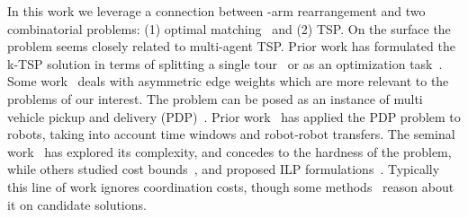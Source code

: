 
In this work we leverage a connection between \dual-arm rearrangement and two combinatorial problems: (1) optimal matching~\cite{edmonds1965maximum} and (2) TSP. On the surface the problem seems closely related to multi-agent TSP.
Prior work has formulated the k-TSP solution in terms of splitting a single tour~\cite{frederickson1976approximation} or as an optimization task~\cite{rathinam2006matroid}.
Some work~\cite{friggstad2013multiple} deals with asymmetric edge weights which are more relevant to the problems of our interest. 
The problem can be posed as an instance of multi vehicle pickup and delivery (PDP)~\cite{parragh2008survey}. 
Prior work~\cite{coltin2014multi} has applied the PDP problem to robots, taking into account time windows and robot-robot transfers.
The seminal work~\cite{lenstra1981complexity,savelsbergh1995general} has explored its complexity, and concedes to the hardness of the problem, while others studied cost bounds~\cite{TrePavFra13}, and proposed ILP formulations~\cite{savelsbergh1995general}. 
Typically this line of work ignores coordination costs, though some methods~\cite{caricato2003parallel} reason about it on candidate solutions.

